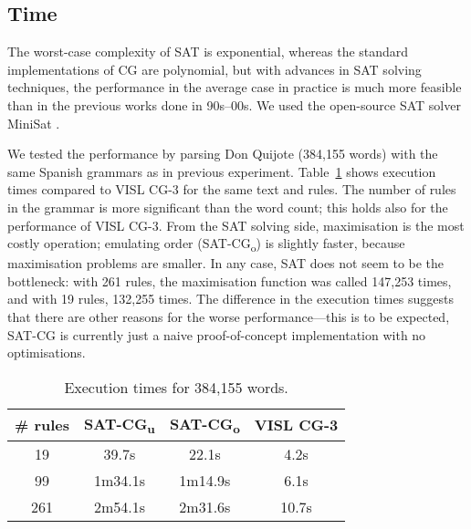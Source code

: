 \documentclass[11pt]{article}
\newcommand{\Mypm}{\mathbin{\tikz [x=1.4ex,y=1.4ex,line width=.1ex] \draw (0.0,0) -- (1.0,0) (0.5,0.08) -- (0.5,0.92) (0.0,0.5) -- (1.0,0.5);}}%
\begin{document}


\subsection{Time}

The worst-case complexity of SAT is exponential, whereas the standard
implementations of CG are polynomial, but with advances in SAT solving
techniques, the performance in the average case in practice is much more feasible than in the previous works done in 90s--00s.
We used the open-source SAT solver MiniSat \cite{een04sat}.

We tested the performance by parsing Don Quijote (384,155 words) with
the same Spanish grammars as in previous experiment. Table~\ref{table:time} shows execution times compared to VISL
CG-3 for the same text and rules. 
The number of rules in the grammar is more significant than the word
count; this holds also for the performance of VISL CG-3.
From the SAT solving side, maximisation is the most costly operation; 
emulating order (SAT-CG\textsubscript{o}) is slightly faster, because maximisation problems are smaller.
In any case, SAT does not seem to be the bottleneck: with 261 rules,
the maximisation function was called 147,253 times, and with 19 rules,
132,255 times. 
The difference in the execution times suggests that there are other
reasons for the worse performance---this is to be expected,
SAT-CG is currently just a naive proof-of-concept implementation with no optimisations.

\begin{table}
  \centering
  \begin{tabular}{|c|c|c|c|}
     \hline
     \textbf{\# rules} &  \textbf{SAT-CG\textsubscript{u}} & \textbf{SAT-CG\textsubscript{o}} & \textbf{VISL CG-3} \\ \hline
      19   & 39.7s &  22.1s   & 4.2s\\ %
      99   & 1m34.1s & 1m14.9s & 6.1s \\ %
      261  & 2m54.1s & 2m31.6s & 10.7s \\ \hline
  \end{tabular}
  \caption{Execution times for 384,155 words.}
  \label{table:time}
\end{table}
\end{document}
